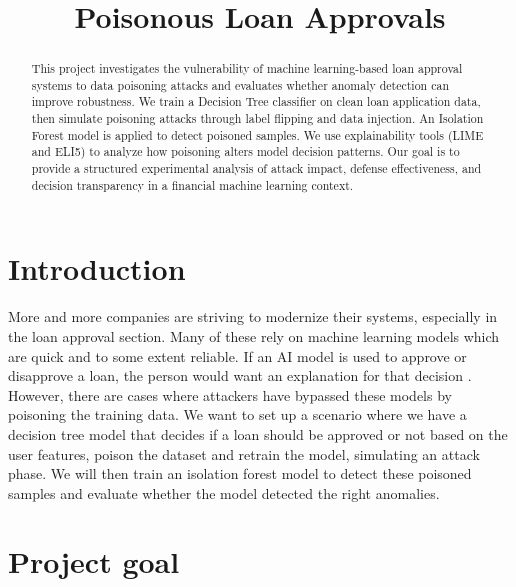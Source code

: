\documentclass[conference]{IEEEtran}
\begin{document}
\title{Poisonous Loan Approvals}

\author{
}

\maketitle

\begin{abstract}
This project investigates the vulnerability of machine learning-based loan approval systems to data poisoning attacks and evaluates whether anomaly detection can improve robustness. We train a Decision Tree classifier on clean loan application data, then simulate poisoning attacks through label flipping and data injection. An Isolation Forest model is applied to detect poisoned samples. We use explainability tools (LIME and ELI5) to analyze how poisoning alters model decision patterns. Our goal is to provide a structured experimental analysis of attack impact, defense effectiveness, and decision transparency in a financial machine learning context.
\end{abstract}

\section{Introduction}
More and more companies are striving to modernize their systems, especially in the loan approval section. Many of these rely on machine learning models which are quick and to some extent reliable. If an AI model is used to approve or disapprove a loan, the person would want an explanation for that decision \cite{Molnar2025}. However, there are cases where attackers have bypassed these models by poisoning the training data. We want to set up a scenario where we have a decision tree model that decides if a loan should be approved or not based on the user features, poison the dataset and retrain the model, simulating an attack phase. We will then train an isolation forest model to detect these poisoned samples and evaluate whether the model detected the right anomalies. 


\section{Project goal}
\end{document}
